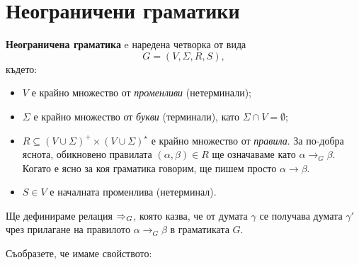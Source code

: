 \section{Неограничени граматики}\label{sect:unrestricted-grammar}

{\bf Неограничена граматика} e наредена четворка от вида
\[G = (V, \Sigma, R, S),\]
където:
\begin{itemize}
\item
  $V$ е крайно множество от {\em променливи} (нетерминали);
\item
  $\Sigma$ е крайно множество от {\em букви} (терминали), като $\Sigma \cap V = \emptyset$;
\item
  $R \subseteq (V\cup\Sigma)^+ \times (V \cup \Sigma)^\star$ е крайно множество от {\em правила}.
  За по-добра яснота, обикновено правилата $(\alpha, \beta) \in R$ ще означаваме като 
  $\alpha \to_G \beta$. Когато е ясно за коя граматика говорим, ще пишем просто $\alpha \to \beta$.
\item
  $S \in V$ е началната променлива (нетерминал). 
\end{itemize}

Ще дефинираме релация $\derive{}_G$, която казва, че от думата $\gamma$ се получава думата $\gamma'$ чрез прилагане на правилото $\alpha \to_G \beta$ в граматиката $G$.

\begin{important}
  \begin{prooftree}
  \end{prooftree}
\end{important}

Съобразете, че имаме свойството:
  \begin{prooftree}
  \end{prooftree}

